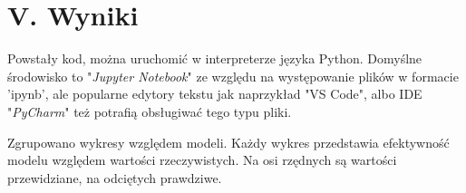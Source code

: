 
{}
\justify
\fontsize{14}{16}\selectfont
\setlength{\parindent}{0pt}
\section*{V. Wyniki } 
\fontsize{12}{14}\selectfont

\hspace{1.5cm} Powstały kod, można uruchomić w interpreterze języka Python.
Domyślne środowisko to "\textit{Jupyter Notebook}" ze względu na występowanie plików w formacie 'ipynb', ale popularne edytory tekstu jak naprzykład "VS Code", albo IDE "\textit{PyCharm}" też potrafią obsługiwać tego typu pliki.

\hspace{1.5cm} Zgrupowano wykresy względem modeli. Każdy wykres przedstawia efektywność modelu względem wartości rzeczywistych.
Na osi rzędnych są wartości przewidziane, na odciętych prawdziwe.
















\clearpage
